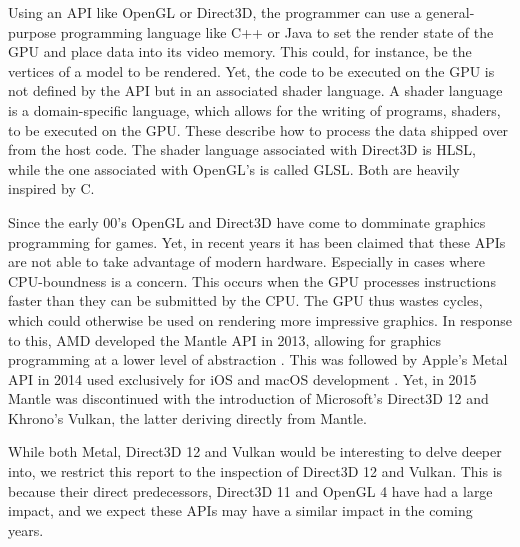 Using an \gls{API} like OpenGL or Direct3D, the programmer can use a general-purpose programming language like C++ or Java to set the render state of the \gls{GPU} and place data into its video memory.
This could, for instance, be the vertices of a model to be rendered. 
Yet, the code to be executed on the \gls{GPU} is not defined by the \gls{API} but in an associated shader language.  
A shader language is a domain-specific language, which allows for the writing of programs, shaders, to be executed on the \gls{GPU}.
These describe how to process the data shipped over from the host code. 
The shader language associated with Direct3D is \gls{HLSL}, while the one associated with OpenGL's is called \gls{GLSL}.
Both are heavily inspired by C.


Since the early 00's OpenGL and Direct3D have come to domminate graphics programming for games.
Yet, in recent years it has been claimed that these \glspl{API} are not able to take advantage of modern hardware.
Especially in cases where \gls{CPU}-boundness is a concern.
This occurs when the \gls{GPU} processes instructions faster than they can be submitted by the \gls{CPU}.
The \gls{GPU} thus wastes cycles, which could otherwise be used on rendering more impressive graphics. 
In response to this, AMD developed the Mantle \gls{API} in 2013, allowing for graphics programming at a lower level of abstraction \cite{wikiMantle}. 
This was followed by Apple’s Metal \gls{API} in 2014 used exclusively for iOS and macOS development \cite{wikiMetal}. 
Yet, in 2015 Mantle was discontinued with the introduction of Microsoft’s Direct3D 12\cite{wikipedia????directx} and Khrono’s Vulkan\cite{wikiVulkan}, the latter deriving directly from Mantle. 


While both Metal, Direct3D 12 and Vulkan would be interesting to delve deeper into, we restrict this report to the inspection of Direct3D 12 and Vulkan.
This is because their direct predecessors, Direct3D 11 and OpenGL 4 have had a large impact, and we expect these \glspl{API} may have a similar impact in the coming years.




